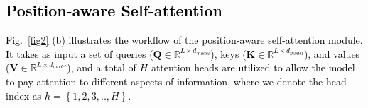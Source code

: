 \documentclass[journal]{IEEEtran}
\begin{document}
\subsection{\textcolor{black}{Position-aware Self-attention}}\label{sec4.2}

\textcolor{black}{Fig.~\ref{fig2} (b) illustrates the workflow of the position-aware self-attention module. It takes as input a set of queries ($\textbf{Q}\!\in \!\mathbb{R}^{L\times d_{model}}$), keys ($\textbf{K}\!\in\!\mathbb{R}^{L\times d_{model}}$), and values ($\textbf{V}\!\in\!\mathbb{R}^{L\times d_{model}}$), and a total of $H$ attention heads are utilized to allow the model to pay attention to different aspects of information, where we denote the head index as $h\!=\!\left\{1,2,3,..,H\right\}$.}

\end{document}

